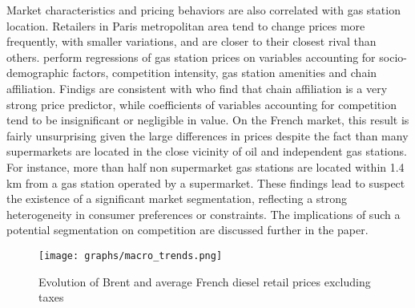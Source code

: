 \documentclass[english]{article}
\begin{document}
Market characteristics and pricing behaviors are also correlated with gas station location. Retailers in Paris metropolitan area tend to change prices more frequently, with smaller variations, and are closer to their closest rival than others. \cite{CHA16} perform regressions of gas station prices on variables accounting for socio-demographic factors, competition intensity, gas station amenities and chain affiliation. Findigs are consistent with \cite{HOS08} who find that chain affiliation is a very strong price predictor, while coefficients of variables accounting for competition tend to be insignificant or negligible in value. On the French market, this result is fairly unsurprising given the large differences in prices despite the fact than many supermarkets are located in the close vicinity of oil and independent gas stations. For instance, more than half non supermarket gas stations are located within 1.4 km from a gas station operated by a supermarket. These findings lead to suspect the existence of a significant market segmentation, reflecting a strong heterogeneity in consumer preferences or constraints. The implications of such a potential segmentation on competition are discussed further in the paper.

\begin{figure}%
    \caption{Evolution of Brent and average French diesel retail prices excluding taxes}
	\centering
		\texttt{[image: graphs/macro\_trends.png]}
\label{fig:brent_and_diesel}
\end{figure}
\end{document}
